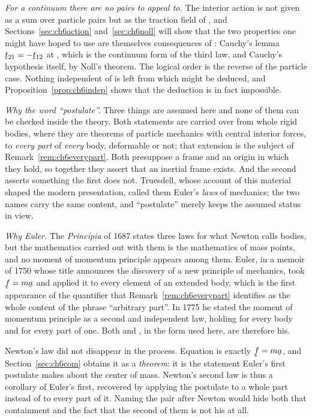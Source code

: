\begin{remark}
\emph{For a continuum there are no pairs to appeal to.} The interior
action is not given as a sum over particle pairs but as the traction
field of , and Sections~\ref{sec:ch6action}
and~\ref{sec:ch6noll} will show that the two properties one might have
hoped to use are themselves consequences of : Cauchy's lemma
$\bt_{21}=-\bt_{12}$ at , which is the continuum form of the
third law, and Cauchy's hypothesis  itself, by Noll's theorem.
The logical order is the reverse of the particle case. Nothing
independent of  is left from which  might be
deduced, and Proposition~\ref{prop:ch6indep} shows that the deduction is
in fact impossible.

\emph{Why the word ``postulate''.} Three things are assumed here and
none of them can be checked inside the theory. Both statements are
carried over from whole rigid bodies, where they are theorems of
particle mechanics with central interior forces, to \emph{every part} of
\emph{every} body, deformable or not; that extension is the subject of
Remark~\ref{rem:ch6everypart}. Both presuppose a frame and an origin in
which they hold, so together they assert that an inertial frame exists.
And the second asserts something the first does not. Truesdell, whose
account of this material shaped the modern presentation, called them
Euler's \emph{laws} of mechanics; the two names carry the same content,
and ``postulate'' merely keeps the assumed status in view.

\emph{Why Euler.} The \emph{Principia} of 1687 states three laws for
what Newton calls bodies, but the mathematics carried out with them is
the mathematics of mass points, and no moment of momentum principle
appears among them. Euler, in a memoir of 1750 whose title announces the
discovery of a new principle of mechanics, took $\vek{f}=m\ba$ and
applied it to every element of an extended body, which is the first
appearance of the quantifier that Remark~\ref{rem:ch6everypart}
identifies as the whole content of the phrase ``arbitrary part''. In
1775 he stated the moment of momentum principle as a second and
independent law, holding for every body and for every part of one. Both
 and , in the form used here, are therefore his.

Newton's law did not disappear in the process. Equation  is
exactly $\vek{f}=m\ba$, and Section~\ref{sec:ch6com} obtains it as a
\emph{theorem}: it is the statement Euler's first postulate makes about
the center of mass. Newton's second law is thus a corollary of Euler's
first, recovered by applying the postulate to a whole part instead of to
every part of it. Naming the pair after Newton would hide both that
containment and the fact that the second of them is not his at all.
\end{remark}

